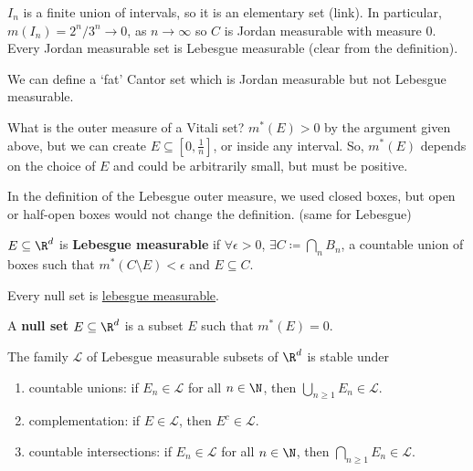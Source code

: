 \documentclass{article}
\newcommand{\1}[1]{\mathbbm{1}_{#1}}
\begin{document}
\begin{remark}
    $I_n$ is a finite union of intervals, so it is an elementary set (link). In particular, $m(I_n) = 2^n / 3^n \to 0$, as $n \to \infty$ so $C$ is Jordan measurable with measure $0$.
    Every Jordan measurable set is Lebesgue measurable (clear from the definition).
\end{remark}

We can define a `fat' Cantor set which is Jordan measurable but not Lebesgue measurable.

\begin{remark}
    What is the outer measure of a Vitali set?
    $m^*(E) > 0$ by the argument given above, but we can create $E \subseteq [0, \frac1n]$, or inside any interval. So, $m^*(E)$ depends on the choice of $E$ and could be arbitrarily small, but must be positive.
\end{remark}

\begin{remark}
    In the definition of the Lebesgue outer measure, we used closed boxes, but open or half-open boxes would not change the definition. (same for Lebesgue)
\end{remark}

\begin{defi}
    $E \subseteq \R^d$ is \textbf{Lebesgue measurable} if $\forall \epsilon > 0$, $\exists C \coloneqq \bigcap_{n} B_n$, a countable union of boxes such that $m^*(C \setminus E) < \epsilon$ and $E \subseteq C$.
\end{defi}

\begin{remark}
    Every null set is \hyperlink{def:lebMAble}{lebesgue measurable}.
\end{remark}

\begin{defi}
    A \textbf{null set} $E \subseteq \R^d$ is a subset $E$ such that $m^*(E) = 0$.
\end{defi}

\begin{prop}
    The family $\mathcal{L}$ of Lebesgue measurable subsets of $\R^d$ is stable under
    \begin{enumerate}[label=\alph*)]
        \item countable unions: if $E_n \in \mathcal{L}$ for all $n \in \N$, then $\bigcup_{n \geq 1} E_n \in \mathcal{L}$.
        \item complementation: if $E \in \mathcal{L}$, then $E^c \in \mathcal{L}$.
        \item countable intersections: if $E_n \in \mathcal{L}$ for all $n \in \N$, then $\bigcap_{n \geq 1} E_n \in \mathcal{L}$.
    \end{enumerate}
\end{prop}
\end{document}
